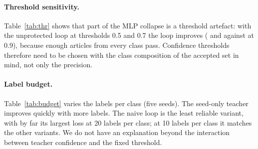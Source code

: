 \documentclass[11pt]{article}
\begin{document}
\paragraph{Threshold sensitivity.} Table~\ref{tab:thr} shows that part of the MLP collapse is a threshold artefact: with the unprotected loop at thresholds 0.5 and 0.7 the loop improves (\thrZeroFiveNaive{} and \thrZeroSevenNaive{} against \thrZeroNineNaive{} at 0.9), because enough articles from every class pass. Confidence thresholds therefore need to be chosen with the class composition of the accepted set in mind, not only the precision.

\paragraph{Label budget.} Table~\ref{tab:budget} varies the labels per class (five seeds). The seed-only teacher improves quickly with more labels. The naive loop is the least reliable variant, with by far its largest loss at 20 labels per class; at 10 labels per class it matches the other variants. We do not have an explanation beyond the interaction between teacher confidence and the fixed threshold.

\begin{table}[t]
\centering\small
\caption{MLP teacher, naive and verified loops at confidence thresholds 0.5, 0.7 and 0.9 (five seeds; $\Delta$ relative to the seed-only teacher of the same seeds).}\label{tab:thr}
\resizebox{\textwidth}{!}{}
\end{table}
\begin{table}[t]
\centering\small
\caption{Test macro-F1 by label budget (MLP teacher, threshold 0.9, five seeds).}\label{tab:budget}
\resizebox{\textwidth}{!}{}
\end{table}


\end{document}
